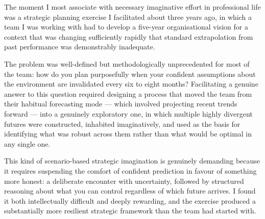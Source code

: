 \begin{ieltsanswer}
The moment I most associate with necessary imaginative effort in professional life was a strategic planning exercise I facilitated about three years ago, in which a team I was working with had to develop a five-year organisational vision for a context that was changing sufficiently rapidly that standard extrapolation from past performance was demonstrably inadequate.

The problem was well-defined but methodologically unprecedented for most of the team: how do you plan purposefully when your confident assumptions about the environment are invalidated every six to eight months? Facilitating a genuine answer to this question required designing a process that moved the team from their habitual forecasting mode — which involved projecting recent trends forward — into a genuinely exploratory one, in which multiple highly divergent futures were constructed, inhabited imaginatively, and used as the basis for identifying what was robust across them rather than what would be optimal in any single one.

This kind of scenario-based strategic imagination is genuinely demanding because it requires suspending the comfort of confident prediction in favour of something more honest: a deliberate encounter with uncertainty, followed by structured reasoning about what you can control regardless of which future arrives. I found it both intellectually difficult and deeply rewarding, and the exercise produced a substantially more resilient strategic framework than the team had started with.
\end{ieltsanswer}


